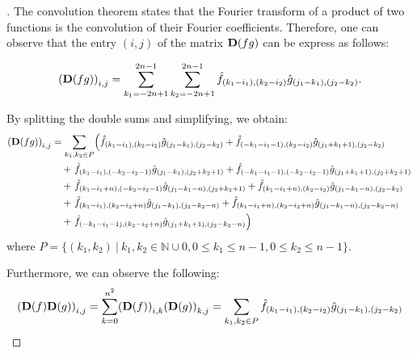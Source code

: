 \begin{proof}[]
The convolution theorem states that the Fourier transform of a product of two functions is the convolution of their Fourier coefficients. Therefore, one can observe that the entry $(i, j)$ of the matrix $\mathbf{D}(f g)$ can be express as follows:

\begin{equation*}
    \leftmat \Dmat(f g) \rightmat_{i, j} = \sum_{k_1 = -2n + 1}^{2n-1} \sum_{k_2 = -2n + 1}^{2n-1} \hat{f}_{(k_1-i_1),(k_2-i_2)} \hat{g}_{(j_1-k_1),(j_2-k_2)}. 
\end{equation*}


By splitting the double sums and simplifying, we obtain:
\begin{align} \label{equation:split_double_sum}
\left( \Dmat(f g) \right)_{i, j} &= 
\sum_{k_1, k_2 \in P} \left(
\hat{f}_{(k_1-i_1),(k_2-i_2)} \hat{g}_{(j_1-k_1),(j_2-k_2)} +
\hat{f}_{(-k_1-i_1-1),(k_2-i_2)} \hat{g}_{(j_1+k_1+1),(j_2-k_2)} \right. \notag \\ &\quad+ \left.
\hat{f}_{(k_1-i_1),(-k_2-i_2-1)} \hat{g}_{(j_1-k_1),(j_2+k_2+1)} +
\hat{f}_{(-k_1-i_1-1),(-k_2-i_2-1)} \hat{g}_{(j_1+k_1+1),(j_2+k_2+1)} \right. \notag \\ &\quad+ \left.
\hat{f}_{(k_1-i_1+n),(-k_2-i_2-1)} \hat{g}_{(j_1-k_1-n),(j_2+k_2+1)} +
\hat{f}_{(k_1-i_1+n),(k_2-i_2)} \hat{g}_{(j_1-k_1-n),(j_2-k_2)} \right. \notag \\ &\quad+ \left.
\hat{f}_{(k_1-i_1),(k_2-i_2+n)} \hat{g}_{(j_1-k_1),(j_2-k_2-n)} +
\hat{f}_{(k_1-i_1+n),(k_2-i_2+n)} \hat{g}_{(j_1-k_1-n),(j_2-k_2-n)} \right. \notag \\ &\quad+ \left.
\hat{f}_{(-k_1-i_1-1),(k_2-i_2+n)} \hat{g}_{(j_1+k_1+1),(j_2-k_2-n)}  \right)
\end{align}
where $P = \{ (k_1, k_2)\ |\ k_1, k_2 \in \mathbb{N} \cup 0, 0 \leq k_1 \leq n-1,  0 \leq k_2 \leq n-1 \}$.


Furthermore, we can observe the following:
\begin{equation*}
    \leftmat \Dmat(f) \Dmat(g) \rightmat_{i, j} = \sum_{k = 0}^{n^2} \leftmat\Dmat(f)\rightmat_{i, k} \leftmat\Dmat(g)\rightmat_{k, j}  = \sum_{k_1, k_2 \in P} \hat{f}_{(k_1-i_1),(k_2-i_2)} \hat{g}_{(j_1-k_1),(j_2-k_2)}
\end{equation*}


\end{proof}

